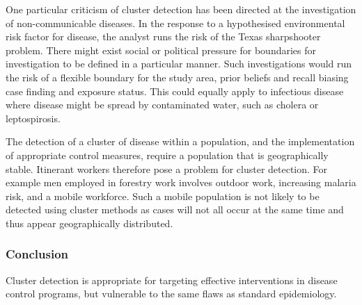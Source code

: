 \documentclass[11pt,a4paper,twoside]{article}\usepackage[]{graphicx}\usepackage[]{color}
\begin{document}
One particular criticism of cluster detection has been directed at the investigation of non-communicable diseases.
In the response to a hypothesised environmental risk factor for disease, the analyst runs the risk of the Texas sharpshooter problem. \cite{Rothman1990, Elliott2004}
There might exist social or political pressure for boundaries for investigation to be defined in a particular manner.
Such investigations would run the risk of a flexible boundary for the study area, prior beliefs and recall biasing case finding and exposure status. 
This could equally apply to infectious disease where disease might be spread by contaminated water, such as cholera or leptospirosis. 

The detection of a cluster of disease within a population, and the implementation of appropriate control measures, require a population that is geographically stable. 
Itinerant workers therefore pose a problem for cluster detection. 
For example men employed in forestry work involves outdoor work, increasing malaria risk, and a mobile workforce. 
Such a mobile population is not likely to be detected using cluster methods as cases will not all occur at the same time and thus appear geographically distributed.\cite{Cotter2013}

\subsubsection{Conclusion}
Cluster detection is appropriate for targeting effective interventions in disease control programs, but vulnerable to the same flaws as standard epidemiology. 


\end{document}
